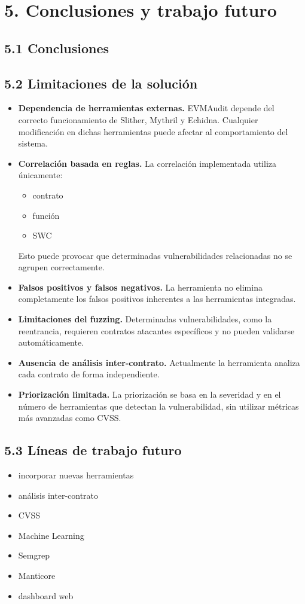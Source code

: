 \section{5. Conclusiones y trabajo
futuro}\label{conclusiones-y-trabajo-futuro}

\subsection{5.1 Conclusiones}\label{conclusiones}

\subsection{5.2 Limitaciones de la
solución}\label{limitaciones-de-la-soluciuxf3n}

\begin{itemize}
\item
  \textbf{Dependencia de herramientas externas.} EVMAudit depende del
  correcto funcionamiento de Slither, Mythril y Echidna. Cualquier
  modificación en dichas herramientas puede afectar al comportamiento
  del sistema.
\item
  \textbf{Correlación basada en reglas.} La correlación implementada
  utiliza únicamente:

  \begin{itemize}
  \tightlist
  \item
    contrato
  \item
    función
  \item
    SWC
  \end{itemize}

  Esto puede provocar que determinadas vulnerabilidades relacionadas no
  se agrupen correctamente.
\item
  \textbf{Falsos positivos y falsos negativos.} La herramienta no
  elimina completamente los falsos positivos inherentes a las
  herramientas integradas.
\item
  \textbf{Limitaciones del fuzzing.} Determinadas vulnerabilidades, como
  la reentrancia, requieren contratos atacantes específicos y no pueden
  validarse automáticamente.
\item
  \textbf{Ausencia de análisis inter-contrato.} Actualmente la
  herramienta analiza cada contrato de forma independiente.
\item
  \textbf{Priorización limitada.} La priorización se basa en la
  severidad y en el número de herramientas que detectan la
  vulnerabilidad, sin utilizar métricas más avanzadas como CVSS.
\end{itemize}

\subsection{5.3 Líneas de trabajo
futuro}\label{luxedneas-de-trabajo-futuro}

\begin{itemize}
\tightlist
\item
  incorporar nuevas herramientas
\item
  análisis inter-contrato\\
\item
  CVSS
\item
  Machine Learning
\item
  Semgrep
\item
  Manticore
\item
  dashboard web
\end{itemize}
